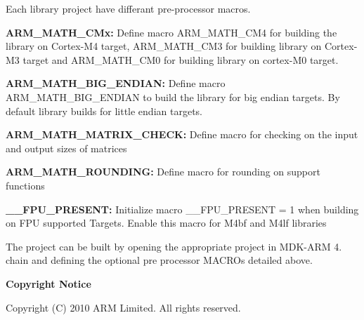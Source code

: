 Each library project have differant pre-\/processor macros.

{\bfseries A\-R\-M\-\_\-\-M\-A\-T\-H\-\_\-\-C\-Mx\-:} Define macro A\-R\-M\-\_\-\-M\-A\-T\-H\-\_\-\-C\-M4 for building the library on Cortex-\/\-M4 target, A\-R\-M\-\_\-\-M\-A\-T\-H\-\_\-\-C\-M3 for building library on Cortex-\/\-M3 target and A\-R\-M\-\_\-\-M\-A\-T\-H\-\_\-\-C\-M0 for building library on cortex-\/\-M0 target.

{\bfseries A\-R\-M\-\_\-\-M\-A\-T\-H\-\_\-\-B\-I\-G\-\_\-\-E\-N\-D\-I\-A\-N\-:} Define macro A\-R\-M\-\_\-\-M\-A\-T\-H\-\_\-\-B\-I\-G\-\_\-\-E\-N\-D\-I\-A\-N to build the library for big endian targets. By default library builds for little endian targets.

{\bfseries A\-R\-M\-\_\-\-M\-A\-T\-H\-\_\-\-M\-A\-T\-R\-I\-X\-\_\-\-C\-H\-E\-C\-K\-:} Define macro for checking on the input and output sizes of matrices

{\bfseries A\-R\-M\-\_\-\-M\-A\-T\-H\-\_\-\-R\-O\-U\-N\-D\-I\-N\-G\-:} Define macro for rounding on support functions

{\bfseries \-\_\-\-\_\-\-F\-P\-U\-\_\-\-P\-R\-E\-S\-E\-N\-T\-:} Initialize macro \-\_\-\-\_\-\-F\-P\-U\-\_\-\-P\-R\-E\-S\-E\-N\-T = 1 when building on F\-P\-U supported Targets. Enable this macro for M4bf and M4lf libraries

The project can be built by opening the appropriate project in M\-D\-K-\/\-A\-R\-M 4. chain and defining the optional pre processor M\-A\-C\-R\-Os detailed above.

{\bfseries Copyright Notice}

Copyright (C) 2010 A\-R\-M Limited. All rights reserved. 